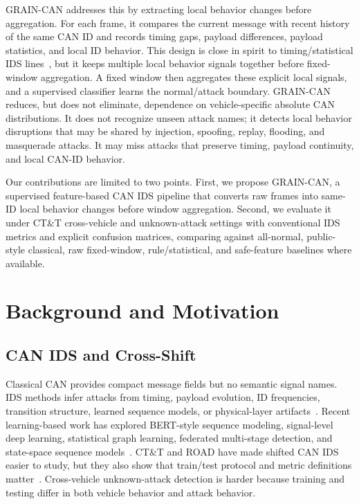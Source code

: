 \documentclass[runningheads]{llncs}
\newcommand{\method}{GRAIN-CAN}
\begin{document}
\method{} addresses this by extracting local behavior changes before aggregation.  For each frame, it compares the current message with recent history of the same CAN ID and records timing gaps, payload differences, payload statistics, and local ID behavior.  This design is close in spirit to timing/statistical IDS lines~\cite{song2016intrusion,taylor2016frequency}, but it keeps multiple local behavior signals together before fixed-window aggregation.  A fixed window then aggregates these explicit local signals, and a supervised classifier learns the normal/attack boundary.  GRAIN-CAN reduces, but does not eliminate, dependence on vehicle-specific absolute CAN distributions.  It does not recognize unseen attack names; it detects local behavior disruptions that may be shared by injection, spoofing, replay, flooding, and masquerade attacks.  It may miss attacks that preserve timing, payload continuity, and local CAN-ID behavior.

Our contributions are limited to two points.  First, we propose GRAIN-CAN, a supervised feature-based CAN IDS pipeline that converts raw frames into same-ID local behavior changes before window aggregation.  Second, we evaluate it under CT\&T cross-vehicle and unknown-attack settings with conventional IDS metrics and explicit confusion matrices, comparing against all-normal, public-style classical, raw fixed-window, rule/statistical, and safe-feature baselines where available.

\section{Background and Motivation}
\subsection{CAN IDS and Cross-Shift}
Classical CAN provides compact message fields but no semantic signal names.  IDS methods infer attacks from timing, payload evolution, ID frequencies, transition structure, learned sequence models, or physical-layer artifacts~\cite{cho2016fingerprinting,cho2017viden,song2016intrusion,taylor2016frequency}.  Recent learning-based work has explored BERT-style sequence modeling, signal-level deep learning, statistical graph learning, federated multi-stage detection, and state-space sequence models~\cite{alkhatib2022canbert,shahriar2022canshield,wang2023statgraph,althunayyan2024federated,liu2026mids}.  CT\&T and ROAD have made shifted CAN IDS easier to study, but they also show that train/test protocol and metric definitions matter~\cite{verma2020road,lampe2024ctt,guerra2024road,kidmose2025cansleuth}.  Cross-vehicle unknown-attack detection is harder because training and testing differ in both vehicle behavior and attack behavior.
\end{document}
